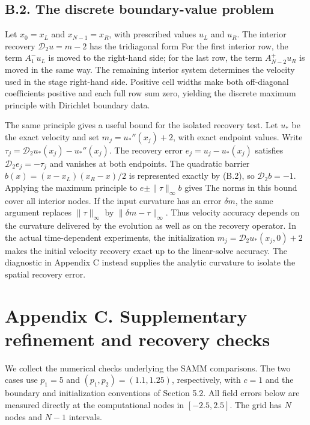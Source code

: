 \subsection*{B.2. The discrete boundary-value problem}

Let \(x_0=x_L\) and \(x_{N-1}=x_R\), with prescribed values \(u_L\) and \(u_R\). The interior recovery \(\mathcal D_2u=m-2\) has the tridiagonal form
For the first interior row, the term \(A_1^-u_L\) is moved to the right-hand side; for the last row, the term \(A_{N-2}^+u_R\) is moved in the same way. The remaining interior system determines the velocity used in the stage right-hand side. Positive cell widths make both off-diagonal coefficients positive and each full row sum zero, yielding the discrete maximum principle with Dirichlet boundary data.

The same principle gives a useful bound for the isolated recovery test. Let \(u_*\) be the exact velocity and set \(m_j=u_*''(x_j)+2\), with exact endpoint values. Write \(\tau_j=\mathcal D_2u_*(x_j)-u_*''(x_j)\). The recovery error \(e_j=u_j-u_*(x_j)\) satisfies \(\mathcal D_2e_j=-\tau_j\) and vanishes at both endpoints. The quadratic barrier \(b(x)=(x-x_L)(x_R-x)/2\) is represented exactly by (B.2), so \(\mathcal D_2b=-1\). Applying the maximum principle to \(e\pm\|\tau\|_\infty b\) gives
The norms in this bound cover all interior nodes. If the input curvature has an error \(\delta m\), the same argument replaces \(\|\tau\|_\infty\) by \(\|\delta m-\tau\|_\infty\). Thus velocity accuracy depends on the curvature delivered by the evolution as well as on the recovery operator. In the actual time-dependent experiments, the initialization \(m_j=\mathcal D_2u_*(x_j,0)+2\) makes the initial velocity recovery exact up to the linear-solve accuracy. The diagnostic in Appendix C instead supplies the analytic curvature to isolate the spatial recovery error.

\FloatBarrier
\section*{Appendix C. Supplementary refinement and recovery checks}
\label{app:checks}

We collect the numerical checks underlying the SAMM comparisons. The two cases use \(p_1=5\) and \((p_1,p_2)=(1.1,1.25)\), respectively, with \(c=1\) and the boundary and initialization conventions of Section 5.2. All field errors below are measured directly at the computational nodes in \([-2.5,2.5]\). The grid has \(N\) nodes and \(N-1\) intervals.

